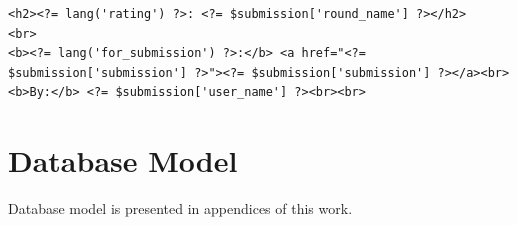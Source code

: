 \begin{lstlisting}[label={assviews}, caption={Example of view in assignments module}]
<h2><?= lang('rating') ?>: <?= $submission['round_name'] ?></h2>
<br>
<b><?= lang('for_submission') ?>:</b> <a href="<?= $submission['submission'] ?>"><?= $submission['submission'] ?></a><br>
<b>By:</b> <?= $submission['user_name'] ?><br><br>
\end{lstlisting}


\section{Database Model}
Database model is presented in appendices of this work.